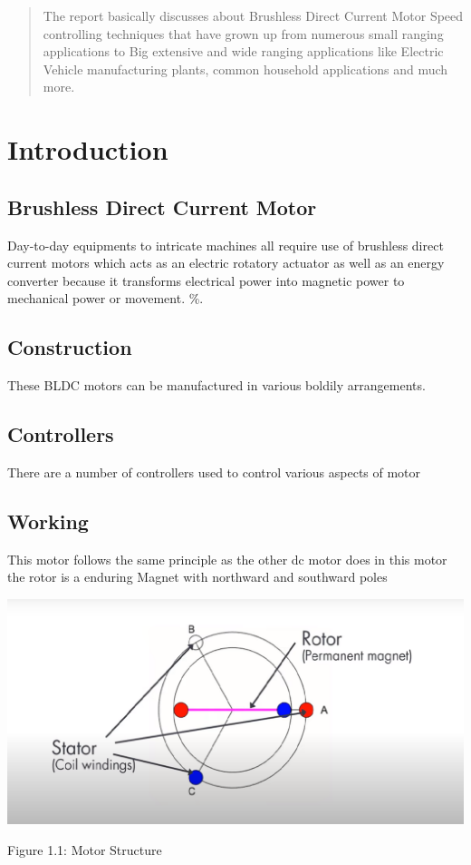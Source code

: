\documentclass[12pt,openright,twoside]{report}
\begin{document}
\newpage
{}
\begin{abstract}
\doublespacing
The report  basically discusses about Brushless Direct Current Motor Speed controlling techniques that have grown up from numerous small ranging applications to Big extensive and wide ranging applications like Electric Vehicle manufacturing plants, common household applications and much more. 
\setcounter{page}{4}
\end{abstract}
\let\cleardoublepage\clearpage
{}
\newpage
\doublespacing\tableofcontents
\newpage
\listoffigures
\newpage
{}
\chapter{Introduction}
\section{Brushless Direct Current Motor} 
Day-to-day equipments to intricate machines all require use of brushless direct current motors which acts as an electric rotatory actuator as well as an energy converter because it transforms electrical power into magnetic power to mechanical power or movement. 
\%.
\section{Construction}
These BLDC motors can be manufactured in various boldily arrangements. 

\section{Controllers}
There are a number of controllers used to control various aspects of motor 

\section{Working}
This motor follows the same principle as the other dc motor does in this motor the rotor is a enduring Magnet with northward and southward poles 


\centering
\centerline{\includegraphics[scale=.5]{MOTOR STRUCTURE.png}}
\caption{Figure 1.1: Motor Structure}
\usepackage{}
\justifying
\end{document}
